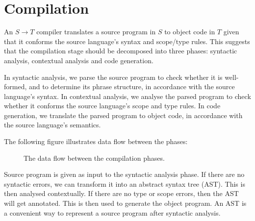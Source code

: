 \documentclass[a4paper, openany]{memoir}
\begin{document}
\newpage

\section{Compilation}
An $S \to T$ compiler translates a source program in $S$ to object code in $T$ given that it conforms the source language's syntax and scope/type rules. This suggests that the compilation stage should be decomposed into three phases: syntactic analysis, contextual analysis and code generation. 

In syntactic analysis, we parse the source program to check whether it is well-formed, and to determine its phrase structure, in accordance with the source language's syntax. In contextual analysis, we analyse the parsed program to check whether it conforms the source language's scope and type rules. In code generation, we translate the parsed program to object code, in accordance with the source language's semantics.

The following figure illustrates data flow between the phases:
\begin{figure}[H]
    \centering
    \caption{The data flow between the compilation phases.}
\end{figure}
Source program is given as input to the syntactic analysis phase. If there are no syntactic errors, we can transform it into an abstract syntax tree (AST). This is then analysed contextually. If there are no type or scope errors, then the AST will get annotated. This is then used to generate the object program. An AST is a convenient way to represent a source program after syntactic analysis.
\end{document}

